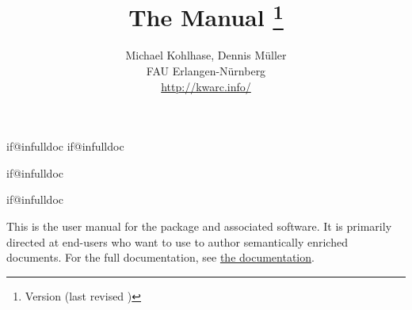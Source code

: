 \makeatletter
\ifcsname if@infulldoc\endcsname\else
    \expandafter\newif\csname if@infulldoc\endcsname\@infulldocfalse
\fi
\makeatother

\csname if@infulldoc\endcsname\else

\def\bibfolder#1{#1}



\infulldoctrue


  \csname if@infulldoc\endcsname\else
	\title{
		The {} Manual
		\thanks{Version {\fileversion} (last revised {\filedate})}
 	}
	\author{Michael Kohlhase, Dennis Müller\\
		FAU Erlangen-Nürnberg\\
		\url{http://kwarc.info/}
	}
	\maketitle
	
	\bigskip

  This is the user manual for the \sTeX package and 
  associated software. It is primarily directed at end-users 
  who want to use \sTeX to author semantically
  enriched documents. For the full documentation, see
  \href{\basedocurl/stex.pdf}{the \sTeX documentation}.
	
